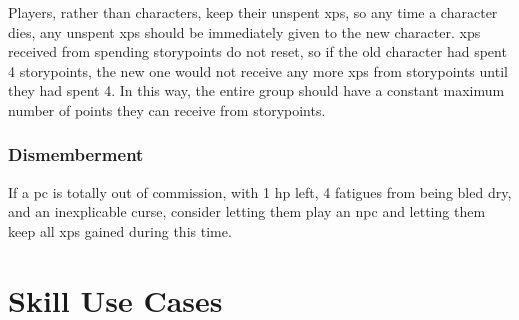 \begin{multicols}{2}
Players, rather than characters, keep their unspent \glspl{xp}, so any time a character dies, any unspent \glspl{xp} should be immediately given to the new character.
\Glspl{xp} received from spending \glspl{storypoint} do not reset, so if the old character had spent 4 \glspl{storypoint}, the new one would not receive any more \glspl{xp} from \glspl{storypoint} until they had spent 4.
In this way, the entire group should have a constant maximum number of points they can receive from \glspl{storypoint}.

\subsubsection{Dismemberment}

If a \gls{pc} is totally out of commission, with 1 \gls{hp} left, 4 \glspl{fatigue} from being bled dry, and an inexplicable curse, consider letting them play an \gls{npc} and letting them keep all \glspl{xp} gained during this time.

\end{multicols}

\section{Skill Use Cases}
\label{skill_uses}

